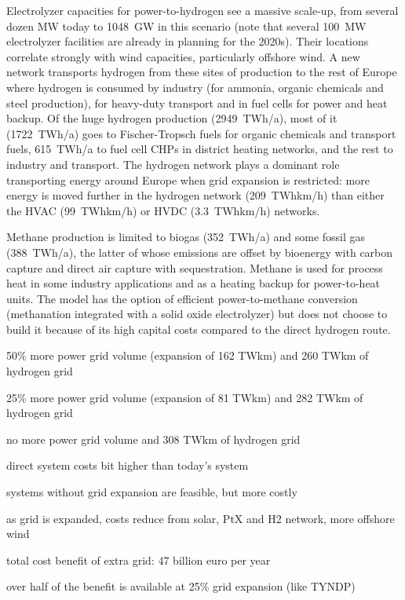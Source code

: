 Electrolyzer capacities for power-to-hydrogen see a massive scale-up,
from several dozen MW today to 1048~GW in this scenario (note that
several 100~MW electrolyzer facilities are already in planning for the
2020s). Their locations correlate strongly with wind capacities,
particularly offshore wind. A new network
transports hydrogen from these sites of production to the rest of
Europe where hydrogen is consumed by industry (for ammonia, organic
chemicals and steel production), for heavy-duty transport and in fuel
cells for power and heat backup. Of the huge hydrogen production
(2949~TWh/a), most of it (1722~TWh/a) goes to Fischer-Tropsch fuels
for organic chemicals and transport fuels, 615~TWh/a to fuel cell CHPs
in district heating networks, and the rest to industry and transport.
The hydrogen network plays a dominant role transporting energy around
Europe when grid expansion is restricted: more energy is moved further
in the hydrogen network (209~TWhkm/h) than either the HVAC
(99~TWhkm/h) or HVDC (3.3~TWhkm/h) networks.

Methane production is limited to biogas (352~TWh/a) and some fossil
gas (388~TWh/a), the latter of whose emissions are offset by bioenergy
with carbon capture and direct air capture with sequestration.
Methane is used for process heat in some industry applications and as
a heating backup for power-to-heat units. The model has the option of
efficient power-to-methane conversion (methanation integrated with a
solid oxide electrolyzer) but does not choose to build it because of
its high capital costs compared to the direct hydrogen route.

50\% more power grid volume (expansion of 162 TWkm) and 260 TWkm of hydrogen grid

25\% more power grid volume (expansion of 81 TWkm) and 282 TWkm of hydrogen grid

no more power grid volume and 308 TWkm of hydrogen grid

direct system costs bit higher than today's system

systems without grid expansion are feasible, but more costly

as grid is expanded, costs reduce from solar, PtX and H2 network, more offshore wind

total cost benefit of extra grid: 47 billion euro per year

over half of the benefit is available at 25\% grid expansion (like TYNDP)







